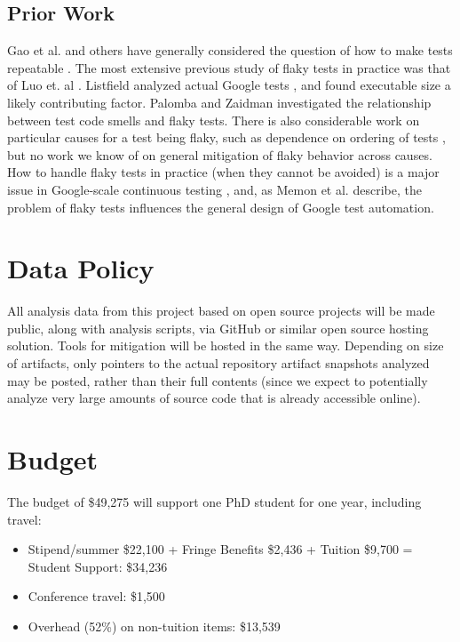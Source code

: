 \documentclass[10pt]{article}
\begin{document}
\subsection{Prior Work}


Gao et al. and others have generally considered the question of how to make tests repeatable \cite{Gao:2015:MSU:2818754.2818764}.  
The most extensive previous study of flaky tests in practice was that of Luo et. al \cite{luo2014empirical}.  Listfield analyzed actual Google tests \cite{listfieldtestanalysis}, and found executable size a likely contributing factor. Palomba and Zaidman \cite{palomba2017does} investigated the relationship between test code smells and flaky tests.  There is also considerable work on particular causes for a test being flaky, such as dependence on ordering of tests \cite{LamZE2015}, but no work we know of on general mitigation of flaky behavior across causes.  How to handle flaky tests in practice (when they cannot be avoided) is a major issue in Google-scale continuous testing \cite{memon2017taming}, and, as Memon et al. describe, the problem of flaky tests influences the general design of Google test automation.




\section{Data Policy}

All analysis data from this project based on open source projects will be made public, along with analysis scripts, via GitHub or similar open source hosting solution.  Tools for mitigation will be hosted in the same way.  Depending on size of artifacts, only pointers to the actual repository artifact snapshots analyzed may be posted, rather than their full contents (since we expect to potentially analyze very large amounts of source code that is already accessible online).

\section{Budget}

The budget of \$49,275 will support one PhD student for one year, including travel:

{\scriptsize
\begin{itemize}
\item Stipend/summer \$22,100 + Fringe Benefits \$2,436 + Tuition \$9,700 = Student Support: \$34,236
\item Conference travel: \$1,500
\item Overhead (52\%) on non-tuition items: \$13,539
\end{itemize}
}
\end{document}
